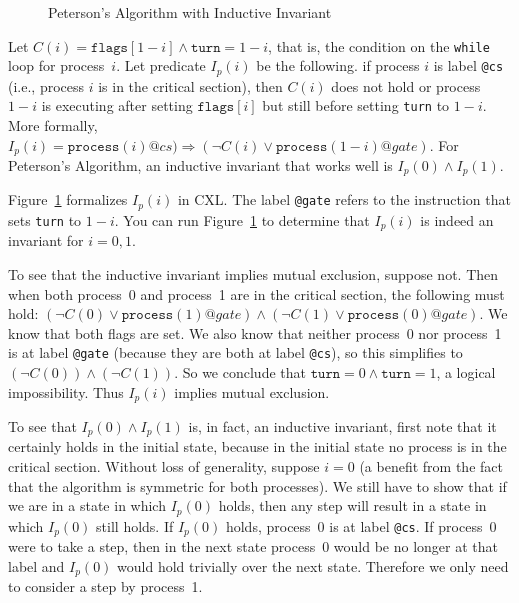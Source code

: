 \documentclass{report}
\newenvironment{code}{
\tcolorbox
}{
\endtcolorbox
}
\begin{document}
\begin{figure}
\begin{code}
\end{code}
\caption{Peterson's Algorithm with Inductive Invariant}
\label{fig:petersonproof}
\end{figure}

Let $C(i) = \mathtt{flags}[1 - i] \land
\mathtt{turn} = 1 - i$, that is, the condition on the \texttt{while} loop
for process~$i$.
Let predicate $I_p(i)$ be the following.
if process $i$ is label \texttt{@cs} (i.e., process $i$ is in the critical section),
then $C(i)$ does not hold or process $1-i$ is executing after setting
$\mathtt{flags}[i]$ but still before setting \texttt{turn} to $1-i$.
More formally, $I_p(i) = \mathtt{process}(i)@cs) \Rightarrow (\lnot C(i) \lor \mathtt{process}(1-i)@gate)$.
For Peterson's Algorithm, an inductive invariant that works well is
$I_p(0) \land I_p(1)$.

Figure~\ref{fig:petersonproof} formalizes $I_p(i)$ in CXL.
The label \texttt{@gate} refers to the instruction that sets \texttt{turn} to $1-i$.
You can run Figure~\ref{fig:petersonproof} to determine
that $I_p(i)$ is indeed an invariant for $i = 0, 1$.

To see that the inductive invariant implies mutual exclusion, suppose not.  Then
when both process~0 and process~1 are in the critical section, the
following must hold:
$(\lnot C(0) \lor \mathtt{process}(1)@gate) \land
 (\lnot C(1) \lor \mathtt{process}(0)@gate)$.
We know that both flags are set.
We also know that neither process~0 nor process~1 is at label \texttt{@gate}
(because they are both at label \texttt{@cs}),
so this simplifies to $(\lnot C(0)) \land (\lnot C(1))$.
So we conclude that $\mathtt{turn} = 0 \land \mathtt{turn} = 1$, a
logical impossibility.  Thus $I_p(i)$ implies mutual exclusion.

To see that $I_p(0) \land I_p(1)$ is, in fact, an inductive invariant, first note that
it certainly holds in the initial state, because in the initial state no process
is in the critical section.
Without loss of generality, suppose $i=0$ (a benefit from the fact that the algorithm is
symmetric for both processes).  We still have to show that if we are in a state
in which $I_p(0)$ holds, then any step will result in a state in which
$I_p(0)$ still holds.
If $I_p(0)$ holds, process~0 is at label \texttt{@cs}.  If process~0
were to take a step, then in the next state process~0 would be no longer
at that label and $I_p(0)$ would hold trivially over the next state.
Therefore we only need to consider a step by process~1.
\end{document}
